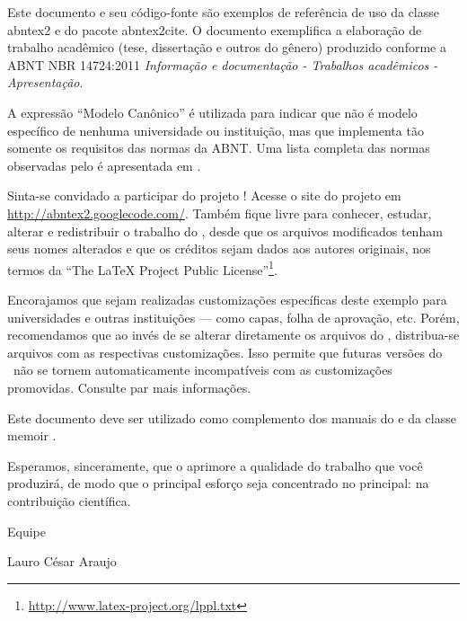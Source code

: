 Este documento e seu código-fonte são exemplos de referência de uso da classe
\textsf{abntex2} e do pacote \textsf{abntex2cite}. O documento
exemplifica a elaboração de trabalho acadêmico (tese, dissertação e outros do
gênero) produzido conforme a ABNT NBR 14724:2011 \emph{Informação e documentação
- Trabalhos acadêmicos - Apresentação}.

A expressão ``Modelo Canônico'' é utilizada para indicar que \abnTeX{} não é
modelo específico de nenhuma universidade ou instituição, mas que implementa tão
somente os requisitos das normas da ABNT. Uma lista completa das normas
observadas pelo \abnTeX{} é apresentada em .

Sinta-se convidado a participar do projeto \abnTeX{}! Acesse o site do projeto em
\url{http://abntex2.googlecode.com/}. Também fique livre para conhecer,
estudar, alterar e redistribuir o trabalho do \abnTeX{}, desde que os arquivos
modificados tenham seus nomes alterados e que os créditos sejam dados aos
autores originais, nos termos da ``The \LaTeX{} Project Public
License''\footnote{\url{http://www.latex-project.org/lppl.txt}}.

Encorajamos que sejam realizadas customizações específicas deste exemplo para
universidades e outras instituições --- como capas, folha de aprovação, etc.
Porém, recomendamos que ao invés de se alterar diretamente os arquivos do
\abnTeX{}, distribua-se arquivos com as respectivas customizações.
Isso permite que futuras versões do \abnTeX{}~não se tornem automaticamente
incompatíveis com as customizações promovidas. Consulte
 par mais informações.

Este documento deve ser utilizado como complemento dos manuais do \abnTeX{}
\cite{abntex2classe,abntex2cite,abntex2cite-alf} e da classe \textsf{memoir}
\cite{memoir}.

Esperamos, sinceramente, que o \abnTeX{} aprimore a qualidade do trabalho que
você produzirá, de modo que o principal esforço seja concentrado no principal:
na contribuição científica.

Equipe \abnTeX{}

Lauro César Araujo


